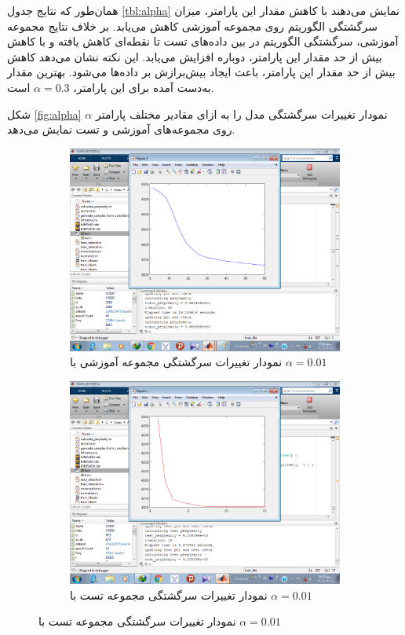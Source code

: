 \documentclass[11.5pt,a4paper]{article}
\begin{document}
همان‌طور که نتایج جدول \ref{tbl:alpha} نمایش می‌دهند با کاهش مقدار این پارامتر، میزان سرگشتگی الگوریتم روی مجموعه آموزشی کاهش می‌یابد. بر خلاف نتایج مجموعه آموزشی، سرگشتگی الگوریتم در بین داده‌های تست تا نقطه‌ای کاهش یافته و با کاهش بیش از حد مقدار این پارامتر، دوباره افزایش می‌یابد. این نکته نشان می‌دهد کاهش بیش از حد مقدار این پارامتر، باعث ایجاد بیش‌برازش بر داده‌ها می‌شود. بهترین مقدار به‌دست آمده برای این پارامتر،‌ $\alpha = 0.3$
است.

شکل 
\ref{fig:alpha}
نمودار تغییرات سرگشتگی مدل را به ازای مقادیر مختلف پارامتر $\alpha$ روی مجموعه‌های آموزشی و تست نمایش می‌دهد.

\begin{figure}[h]
\center
	\begin{subfigure}{.45\textwidth}
		\includegraphics[scale=0.25]{Imgs/k3_b05_a001_25s_ptr3665648.png}
		\caption{نمودار تغییرات سرگشتگی مجموعه‌ آموزشی با $\alpha = 0.01$}
	\end{subfigure}
	\begin{subfigure}{.45\textwidth}
		\includegraphics[scale=0.25]{Imgs/k3_b05_a001_8s_pts4205395.png}
		\caption{نمودار تغییرات سرگشتگی مجموعه‌ تست با $\alpha = 0.01$}
	\end{subfigure}


\end{figure}
\end{document}
